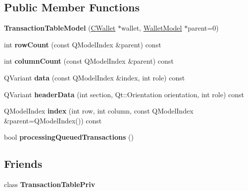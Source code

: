 \subsection*{Public Member Functions}
\begin{DoxyCompactItemize}
\item 
\mbox{\label{class_transaction_table_model_a6c10b7cab9804eee6df9e049a978dc62}} 
{\bfseries Transaction\+Table\+Model} (\mbox{\hyperlink{class_c_wallet}{C\+Wallet}} $\ast$wallet, \mbox{\hyperlink{class_wallet_model}{Wallet\+Model}} $\ast$parent=0)
\item 
\mbox{\label{class_transaction_table_model_a133baec4cadf0b6b9f7a355d1fa14ee6}} 
int {\bfseries row\+Count} (const Q\+Model\+Index \&parent) const
\item 
\mbox{\label{class_transaction_table_model_ae1fee81ee053bb2bf434051583538124}} 
int {\bfseries column\+Count} (const Q\+Model\+Index \&parent) const
\item 
\mbox{\label{class_transaction_table_model_a02173c31b6014bff182e320217e30e10}} 
Q\+Variant {\bfseries data} (const Q\+Model\+Index \&index, int role) const
\item 
\mbox{\label{class_transaction_table_model_ac705ce31fd03c56c936a9df88a216628}} 
Q\+Variant {\bfseries header\+Data} (int section, Qt\+::\+Orientation orientation, int role) const
\item 
\mbox{\label{class_transaction_table_model_af3a9a49314f80268a77a704f7f028905}} 
Q\+Model\+Index {\bfseries index} (int row, int column, const Q\+Model\+Index \&parent=Q\+Model\+Index()) const
\item 
\mbox{\label{class_transaction_table_model_acc2d1abbd5e637b8a754c6d18a46437a}} 
bool {\bfseries processing\+Queued\+Transactions} ()
\end{DoxyCompactItemize}
\subsection*{Friends}
\begin{DoxyCompactItemize}
\item 
\mbox{\label{class_transaction_table_model_a39d3ddddb3af12905ad5538a91753736}} 
class {\bfseries Transaction\+Table\+Priv}
\end{DoxyCompactItemize}


